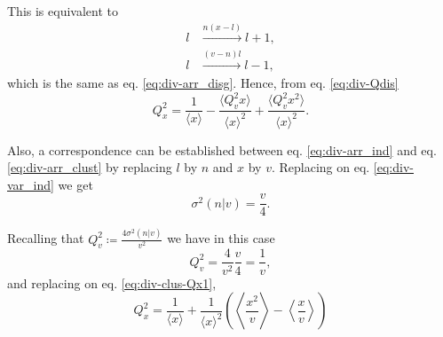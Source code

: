 This is equivalent to
\begin{equation*}
  \begin{split}
    l&\xrightarrow{n(x-l)}l+1,\\
    l&\xrightarrow{(v-n)l}l-1,
  \end{split}
\end{equation*}
which is the same as eq. \eqref{eq:div-arr_disg}. Hence, from eq. \eqref{eq:div-Qdis}
\begin{equation}
  \label{eq:div-clus-Qx1}
  Q_x^2 = \frac{1}{\langle x\rangle} - \frac{\langle Q_v^2x\rangle}{\langle x\rangle^2} + \frac{\langle Q_v^2x^2\rangle}{\langle x\rangle^2}.
\end{equation}

Also, a correspondence can be established between eq. \eqref{eq:div-arr_ind} and eq. \eqref{eq:div-arr_clust} by replacing $l$ by $n$ and $x$ by $v$. Replacing on eq. \eqref{eq:div-var_ind} we get
\begin{equation*}
  \sigma^2(n|v) = \frac{v}{4}.
\end{equation*}

Recalling that $Q_v^2 \coloneqq \frac{4\sigma^2(n|v)}{v^2}$ we have in this case
\begin{equation*}
  Q_v^2 = \frac{4}{v^2}\frac{v}{4} = \frac{1}{v},
\end{equation*}
and replacing on eq. \eqref{eq:div-clus-Qx1},
\begin{equation}
  \label{eq:div-clus-Qx2}
  Q_x^2 = \frac{1}{\langle x\rangle} + \frac{1}{\langle x\rangle^2}\left(\left\langle \frac{x^2}{v}\right\rangle-\left\langle \frac{x}{v}\right\rangle \right)
\end{equation}

